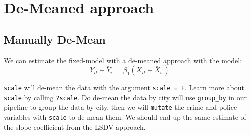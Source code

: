 \documentclass[]{book}
\newenvironment{Shaded}{\begin{snugshade}}{\end{snugshade}}
\newcommand{\DataTypeTok}[1]{\textcolor[rgb]{0.13,0.29,0.53}{#1}}
\newcommand{\DecValTok}[1]{\textcolor[rgb]{0.00,0.00,0.81}{#1}}
\newcommand{\KeywordTok}[1]{\textcolor[rgb]{0.13,0.29,0.53}{\textbf{#1}}}
\newcommand{\NormalTok}[1]{#1}
\newcommand{\OperatorTok}[1]{\textcolor[rgb]{0.81,0.36,0.00}{\textbf{#1}}}
\newcommand{\StringTok}[1]{\textcolor[rgb]{0.31,0.60,0.02}{#1}}
\begin{document}
\hypertarget{de-meaned-approach}{%
\section{De-Meaned approach}\label{de-meaned-approach}}

\hypertarget{manually-de-mean}{%
\subsection{Manually De-Mean}\label{manually-de-mean}}

We can estimate the fixed-model with a de-meaned approach with the model: \[Y_{it}-\bar Y_{i.}=\beta_1(X_{it}-\bar X_{i.})\]

\texttt{scale} will de-mean the data with the argument \texttt{scale\ =\ F}. Learn more about \texttt{scale} by calling \texttt{?scale}. Do de-mean the data by city will use \texttt{group\_by} in our pipeline to group the data by city, then we will \texttt{mutate} the crime and police variables with \texttt{scale} to de-mean them. We should end up the same estimate of the slope coefficient from the LSDV approach.

\begin{Shaded}
\end{Shaded}
\end{document}
